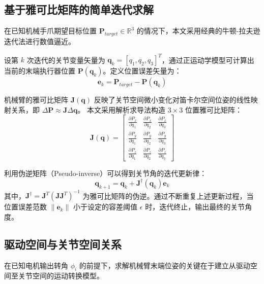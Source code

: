     \subsection{基于雅可比矩阵的简单迭代求解}
    在已知机械手爪期望目标位置 $\boldsymbol{P}_{target} \in \mathbb{R}^{3}$ 的情况下，本文采用经典的牛顿-拉夫逊迭代法进行数值逼近。
    
    设第 $k$ 次迭代的关节变量矢量为 $\boldsymbol{q}_k = [q_1, q_2, q_3]^T$，通过正运动学模型可计算出当前的末端执行器位置 $\boldsymbol{P}(\boldsymbol{q}_k)$。定义位置误差矢量为：
    \begin{equation}
        \boldsymbol{e}_k = \boldsymbol{P}_{target} - \boldsymbol{P}(\boldsymbol{q}_k)
    \end{equation}
    
    机械臂的雅可比矩阵 $\boldsymbol{J}(\boldsymbol{q})$ 反映了关节空间微小变化对笛卡尔空间位姿的线性映射关系，即 $\Delta \boldsymbol{P} \approx \boldsymbol{J} \Delta \boldsymbol{q}$。
    本文采用解析求导法构造 $3 \times 3$ 位置雅可比矩阵：
    \begin{equation}
    \boldsymbol{J}(\boldsymbol{q}) = \begin{bmatrix}
    \frac{\partial P_x}{\partial q_1} & \frac{\partial P_x}{\partial q_2} & \frac{\partial P_x}{\partial q_3} \\
    \frac{\partial P_y}{\partial q_1} & \frac{\partial P_y}{\partial q_2} & \frac{\partial P_y}{\partial q_3} \\
    \frac{\partial P_z}{\partial q_1} & \frac{\partial P_z}{\partial q_2} & \frac{\partial P_z}{\partial q_3}
    \end{bmatrix}
    \end{equation}

    利用伪逆矩阵（Pseudo-inverse）可以得到关节角的迭代更新律：
    \begin{equation}
        \boldsymbol{q}_{k+1} = \boldsymbol{q}_k + \boldsymbol{J}^{\dagger}(\boldsymbol{q}_k) \boldsymbol{e}_k
    \end{equation}
    其中，$\boldsymbol{J}^{\dagger} = \boldsymbol{J}^T (\boldsymbol{J} \boldsymbol{J}^T)^{-1}$ 为雅可比矩阵的伪逆。通过不断重复上述更新过程，当位置误差范数 $\|\boldsymbol{e}_k\|$ 小于设定的容差阈值 $\epsilon$ 时，迭代终止，输出最终的关节角度。
    
    

\subsection{驱动空间与关节空间关系}
在已知电机输出转角 $\phi_i$ 的前提下，求解机械臂末端位姿的关键在于建立从驱动空间至关节空间的运动转换模型。

